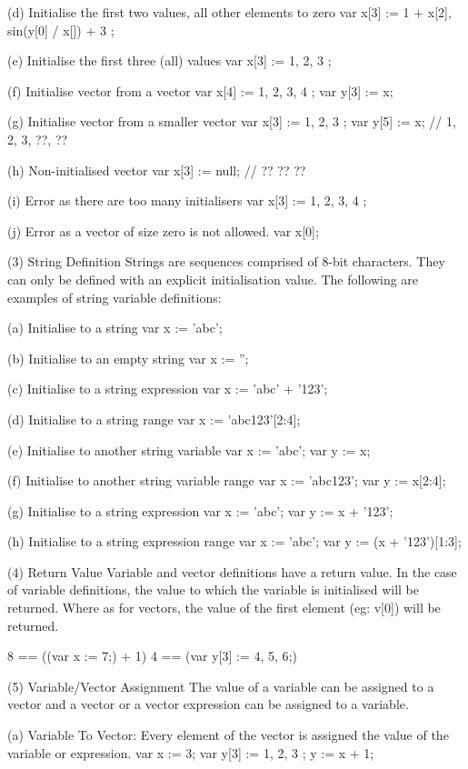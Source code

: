 (d) Initialise the first two values, all other elements to zero
var x[3] := { 1 + x[2], sin(y[0] / x[]) + 3 };

(e) Initialise the first three (all) values
var x[3] := { 1, 2, 3 };

(f) Initialise vector from a vector
var x[4] := { 1, 2, 3, 4 };
var y[3] := x;

(g) Initialise vector from a smaller vector
var x[3] := { 1, 2, 3 };
var y[5] := x;   // 1, 2, 3, ??, ??

(h) Non-initialised vector
var x[3] := null; // ?? ?? ??

(i) Error as there are too many initialisers
var x[3] := { 1, 2, 3, 4 };

(j) Error as a vector of size zero is not allowed.
var x[0];


(3) String Definition
Strings are sequences comprised of 8-bit characters. They can only be
defined  with an explicit  initialisation  value. The  following  are
examples of string variable definitions:

(a) Initialise to a string
var x := 'abc';

(b) Initialise to an empty string
var x := '';

(c) Initialise to a string expression
var x := 'abc' + '123';

(d) Initialise to a string range
var x := 'abc123'[2:4];

(e) Initialise to another string variable
var x := 'abc';
var y := x;

(f) Initialise to another string variable range
var x := 'abc123';
var y := x[2:4];

(g) Initialise to a string expression
var x := 'abc';
var y := x + '123';

(h) Initialise to a string expression range
var x := 'abc';
var y := (x + '123')[1:3];


(4) Return Value
Variable and vector  definitions have a  return value. In  the case of
variable definitions, the value  to which the variable  is initialised
will be returned. Where as for vectors, the value of the first element
(eg: v[0]) will be returned.

8 == ((var x := 7;) + 1)
4 == (var y[3] := {4, 5, 6};)


(5) Variable/Vector Assignment
The value of a variable can be assigned to a vector and a vector or  a
vector expression can be assigned to a variable.

(a) Variable To Vector:
Every element of the vector is assigned the value of the variable
or expression.
var x    := 3;
var y[3] := { 1, 2, 3 };
y := x + 1;

